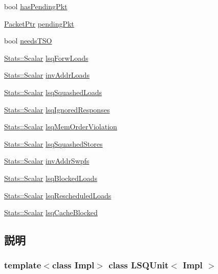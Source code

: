 \begin{DoxyCompactItemize}
bool \hyperlink{classLSQUnit_ae4914b6850f06ca3589fe9e75451fc2e}{hasPendingPkt}
\item 
\hyperlink{classPacket}{PacketPtr} \hyperlink{classLSQUnit_a54d6e1b7bac876ca215b09777bae1d34}{pendingPkt}
\item 
bool \hyperlink{classLSQUnit_abef3db582145f640478056f8413a03e3}{needsTSO}
\item 
\hyperlink{classStats_1_1Scalar}{Stats::Scalar} \hyperlink{classLSQUnit_a2adecfd8b85711a16f91e0fbd7ca8f10}{lsqForwLoads}
\item 
\hyperlink{classStats_1_1Scalar}{Stats::Scalar} \hyperlink{classLSQUnit_ab1c6fb6e4b6c6a243412e594629105ea}{invAddrLoads}
\item 
\hyperlink{classStats_1_1Scalar}{Stats::Scalar} \hyperlink{classLSQUnit_a737697c5df3fbe8e728541fec8220089}{lsqSquashedLoads}
\item 
\hyperlink{classStats_1_1Scalar}{Stats::Scalar} \hyperlink{classLSQUnit_ad620ac240b0d631c3a8aa19cfd05ad41}{lsqIgnoredResponses}
\item 
\hyperlink{classStats_1_1Scalar}{Stats::Scalar} \hyperlink{classLSQUnit_ac499fc2b461e03a110deae7c695f75bc}{lsqMemOrderViolation}
\item 
\hyperlink{classStats_1_1Scalar}{Stats::Scalar} \hyperlink{classLSQUnit_a0abe80f8caefb71a0351c3bed4d99c0e}{lsqSquashedStores}
\item 
\hyperlink{classStats_1_1Scalar}{Stats::Scalar} \hyperlink{classLSQUnit_a893e9b5b65df5710d85f6a583504a11c}{invAddrSwpfs}
\item 
\hyperlink{classStats_1_1Scalar}{Stats::Scalar} \hyperlink{classLSQUnit_a5323f1c2b6bf5cccc59253596656eb70}{lsqBlockedLoads}
\item 
\hyperlink{classStats_1_1Scalar}{Stats::Scalar} \hyperlink{classLSQUnit_af5c24658bed91065bf7d69d27ba9fbd6}{lsqRescheduledLoads}
\item 
\hyperlink{classStats_1_1Scalar}{Stats::Scalar} \hyperlink{classLSQUnit_a33a1cca2455a3e5909f462a778902643}{lsqCacheBlocked}
\end{DoxyCompactItemize}


\subsection{説明}
\subsubsection*{template$<$class Impl$>$ class LSQUnit$<$ Impl $>$}

